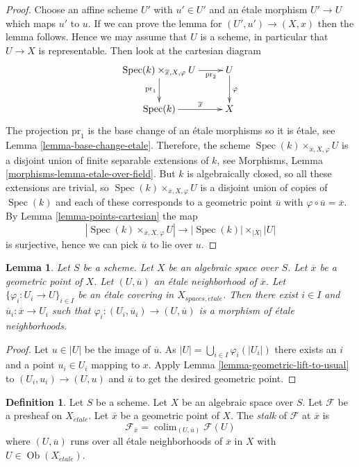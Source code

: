 \documentclass{stacks-project}
\theoremstyle{plain}
\newtheorem{lemma}[subsection]{Lemma}
\theoremstyle{definition}
\newtheorem{definition}[subsection]{Definition}
\theoremstyle{remark}
\numberwithin{equation}{subsection}
\def\colim{\mathop{\mathrm{colim}}\nolimits}
\def\Spec{\mathop{\mathrm{Spec}}}
\def\Ob{\mathop{\mathrm{Ob}}\nolimits}
\def\etale{{\acute{e}tale}}
\begin{document}
\begin{proof}
Choose an affine scheme $U'$ with $u' \in U'$ and an \'etale morphism
$U' \to U$ which maps $u'$ to $u$. If we can prove the lemma for
$(U', u') \to (X, x)$ then the lemma follows. Hence we may assume that
$U$ is a scheme, in particular that $U \to X$ is representable.
Then look at the cartesian diagram
$$
\xymatrix{
\Spec(k) \times_{\overline{x}, X, \varphi} U
\ar[d]_{\text{pr}_1} \ar[r]_-{\text{pr}_2} & U
\ar[d]^\varphi \\
\Spec(k) \ar[r]^-{\overline{x}} & X
}
$$
The projection $\text{pr}_1$ is the base change of an \'etale morphisms
so it is \'etale, see
Lemma \ref{lemma-base-change-etale}.
Therefore, the scheme $\Spec(k) \times_{\overline{x}, X, \varphi} U$
is a disjoint union of finite separable extensions of $k$, see
Morphisms, Lemma \ref{morphisms-lemma-etale-over-field}.
But $k$ is algebraically closed, so all these extensions are trivial,
so $\Spec(k) \times_{\overline{x}, X, \varphi} U$
is a disjoint union of copies of $\Spec(k)$ and each of
these corresponds to a geometric point $\overline{u}$ with
$\varphi \circ \overline{u} = \overline{x}$. By
Lemma \ref{lemma-points-cartesian}
the map
$$
|\Spec(k) \times_{\overline{x}, X, \varphi} U|
\longrightarrow
|\Spec(k)| \times_{|X|} |U|
$$
is surjective, hence we can pick $\overline{u}$ to lie over $u$.
\end{proof}

\begin{lemma}
\label{lemma-geometric-lift-to-cover}
Let $S$ be a scheme. Let $X$ be an algebraic space over $S$.
Let $\overline{x}$ be a geometric point of $X$.
Let $(U, \overline{u})$ an \'etale neighborhood of $\overline{x}$.
Let $\{\varphi_i : U_i \to U\}_{i \in I}$ be an \'etale covering in
$X_{spaces, \etale}$.
Then there exist $i \in I$ and $\overline{u}_i : \overline{x} \to U_i$
such that $\varphi_i : (U_i, \overline{u}_i) \to (U, \overline{u})$
is a morphism of \'etale neighborhoods.
\end{lemma}

\begin{proof}
Let $u \in |U|$ be the image of $\overline{u}$.
As $|U| = \bigcup_{i \in I} \varphi_i(|U_i|)$ there exists an
$i$ and a point $u_i \in U_i$ mapping to $x$. Apply
Lemma \ref{lemma-geometric-lift-to-usual}
to $(U_i, u_i) \to (U, u)$ and $\overline{u}$ to
get the desired geometric point.
\end{proof}

\begin{definition}
\label{definition-stalk}
Let $S$ be a scheme. Let $X$ be an algebraic space over $S$.
Let $\mathcal{F}$ be a presheaf on $X_\etale$.
Let $\overline{x}$ be a geometric point of $X$.
The {\it stalk} of $\mathcal{F}$ at $\overline{x}$ is
$$
\mathcal{F}_{\bar x}
=
\colim_{(U, \overline{u})} \mathcal{F}(U)
$$
where $(U, \overline{u})$ runs over all \'etale neighborhoods
of $\overline{x}$ in $X$ with $U \in \Ob(X_\etale)$.
\end{definition}
\end{document}
